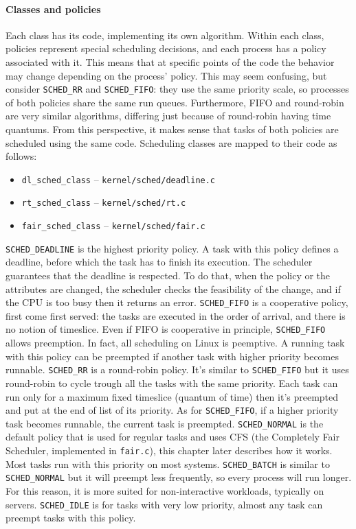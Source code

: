 \paragraph{Classes and policies}
Each class has its code, implementing its own algorithm. Within each class, policies represent special scheduling decisions, and each process has a policy associated with it. This means that at specific points of the code the behavior may change depending on the process' policy. This may seem confusing, but consider \verb|SCHED_RR| and \verb|SCHED_FIFO|: they use the same priority scale, so processes of both policies share the same run queues. Furthermore, FIFO and round-robin are very similar algorithms, differing just because of round-robin having time quantums. From this perspective, it makes sense that tasks of both policies are scheduled using the same code. Scheduling classes are mapped to their code as follows:
\begin{itemize}
\item \verb|dl_sched_class| -- \verb|kernel/sched/deadline.c|
\item \verb|rt_sched_class| -- \verb|kernel/sched/rt.c|
\item \verb|fair_sched_class| -- \verb|kernel/sched/fair.c|
\end{itemize}
\verb|SCHED_DEADLINE| is the highest priority policy. A task with this policy defines a deadline, before which the task has to finish its execution. The scheduler guarantees that the deadline is respected. To do that, when the policy or the attributes are changed, the scheduler checks the feasibility of the change, and if the CPU is too busy then it returns an error.
\verb|SCHED_FIFO| is a cooperative policy, first come first served: the tasks are executed in the order of arrival, and there is no notion of timeslice. Even if FIFO is cooperative in principle, \verb|SCHED_FIFO| allows preemption. In fact, all scheduling on Linux is peemptive. A running task with this policy can be preempted if another task with higher priority becomes runnable.
\verb|SCHED_RR| is a round-robin policy. It's similar to \verb|SCHED_FIFO| but it uses round-robin to cycle trough all the tasks with the same priority. Each task can run only for a maximum fixed timeslice (quantum of time) then it's preempted and put at the end of list of its priority. As for \verb|SCHED_FIFO|, if a higher priority task becomes runnable, the current task is preempted.
\verb|SCHED_NORMAL| is the default policy that is used for regular tasks and uses CFS (the Completely Fair Scheduler, implemented in \verb|fair.c|), this chapter later describes how it works. Most tasks run with this priority on most systems.
\verb|SCHED_BATCH| is similar to \verb|SCHED_NORMAL| but it will preempt less frequently, so every process will run longer. For this reason, it is more suited for non-interactive workloads, typically on servers.
\verb|SCHED_IDLE| is for tasks with very low priority, almost any task can preempt tasks with this policy.

